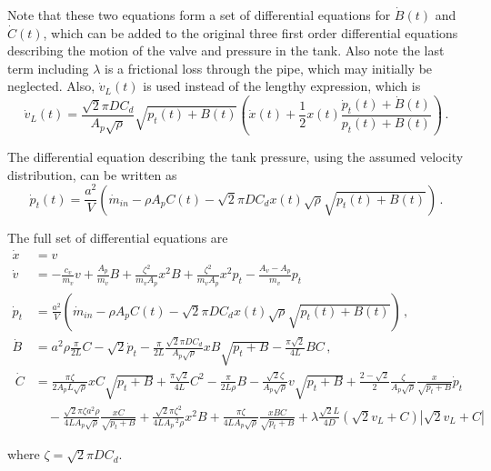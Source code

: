 Note that these two equations form a set of differential equations for $\dot{B}(t)$ and $\dot{C}(t)$, which can be added to the original three first order differential equations describing the motion of the valve and pressure in the tank. Also note the last term including $\lambda$ is a frictional loss through the pipe, which may initially be neglected. Also, $\dot{v}_L(t)$ is used instead of the lengthy expression, which is
~
\begin{equation*}
    \dot{v}_L(t) = \frac{\sqrt{2} \pi D C_d}{A_p \sqrt{\rho}} \sqrt{p_t(t) + B(t)} \left( \dot{x}(t) + \frac{1}{2} x(t) \frac{\dot{p}_t(t) + \dot{B}(t)}{p_t(t) + B(t)} \right) \, .
\end{equation*}

The differential equation describing the tank pressure, using the assumed velocity distribution, can be written as
~
\begin{equation*}
    \dot{p}_t(t) = \frac{a^2}{V} \left( \dot{m}_{in} - \rho A_p C(t) - \sqrt{2} \pi D C_d x(t) \sqrt{\rho} \sqrt{p_t(t) + B(t)} \right) \, .
\end{equation*}

The full set of differential equations are
~
\begin{equation*}
\begin{split}
    \dot{x} &= v \\
    \dot{v} &= - \frac{c_v}{m_v} v + \frac{A_p}{m_v} B + \frac{\zeta^2}{m_v A_p} x^2 B + \frac{\zeta^2}{m_v A_p} x^2 p_t - \frac{A_v - A_p}{m_v} p_t \\
    \dot{p}_t &= \frac{a^2}{V} \left( \dot{m}_{in} - \rho A_p C(t) - \sqrt{2} \pi D C_d x(t) \sqrt{\rho} \sqrt{p_t(t) + B(t)} \right) \, , \\
    \dot{B} &= a^2 \rho \frac{\pi}{2L} C - \sqrt{2} \dot{p}_t - \frac{\pi}{2L} \frac{\sqrt{2} \pi D C_d}{A_p \sqrt{\rho}} x B \sqrt{p_t + B} - \frac{\pi \sqrt{2}}{4L} B C \, , \\
    ~
    \dot{C} &=
    \frac{\pi \zeta}{2 A_p L \sqrt{\rho}} x C \sqrt{p_t + B}
    + \frac{\pi \sqrt{2}}{4L} C^2
    - \frac{\pi}{2 L \rho} B
    - \frac{\sqrt{2} \zeta}{A_p \sqrt{\rho}} v \sqrt{p_t + B}
    + \frac{2 - \sqrt{2}}{2} \frac{\zeta}{A_p \sqrt{\rho}} \frac{x}{\sqrt{p_t + B}} \dot{p}_t \\ &\quad %
    - \frac{\sqrt{2}\pi\zeta a^2 \rho}{4 L A_p \sqrt{\rho}} \frac{x C}{\sqrt{p_t + B}}
    + \frac{\sqrt{2}\pi\zeta^2}{4L A_p\,^2 \rho} x^2 B
    + \frac{\pi \zeta}{4 L A_p \sqrt{\rho}} \frac{x B C}{\sqrt{p_t + B}}
    + \lambda \frac{\sqrt{2}L}{4 D} \left( \sqrt{2} v_L + C \right) \left| \sqrt{2} v_L + C \right|
\end{split}
\end{equation*}

where $\zeta = \sqrt{2} \pi D C_d$.